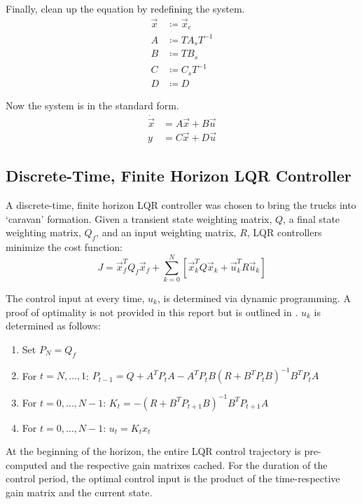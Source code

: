 \documentclass[12pt,onecolumn,reqno]{amsart}
\begin{document}
Finally, clean up the equation by redefining the system.
\begin{align*}
  \vec{x} &\coloneqq \vec{x}_{e}    \\
  A       &\coloneqq T A_{s} T^{-1} \\
  B       &\coloneqq T B_{s}        \\
  C       &\coloneqq C_{s} T^{-1}   \\
  D       &\coloneqq D
\end{align*}

Now the system is in the standard form.
\begin{align*}
  \dot{\vec{x}} &= A \vec{x} + B \vec{u} \\
  y &= C \vec{x} + D \vec{u}
\end{align*}




\subsection{Discrete-Time, Finite Horizon LQR Controller} \label{sec:LQR}
A discrete-time, finite horizon LQR controller was chosen to bring the trucks
into `caravan' formation. Given a transient state weighting matrix, $Q$, a final
state weighting matrix, $Q_{f}$, and an input weighting matrix, $R$, LQR
controllers minimize the cost function:
\begin{equation*}
  J = \vec{x}_{f}^{T} Q_{f} \vec{x}_{f} + \sum_{k=0}^{N} \left[ \vec{x}_{k}^{T} Q
  \vec{x}_{k} + \vec{u}_{k}^{T} R \vec{u}_{k} \right]
\end{equation*}

The control input at every time, $u_k$, is determined via dynamic programming. A
proof of optimality is not provided in this report but is outlined in
\cite{LQRStanford}. $u_k$ is determined as follows: 
\begin{enumerate}
  \item Set $P_{N} = Q_{f}$
  \item For $t=N, \hdots, 1$: $P_{t-1} = Q + A^{T}P_{t}A - A^{T} P_{t}
    B(R + B^{T}P_{t}B)^{-1}B^{T}P_{t}A$
  \item For $t=0, \hdots, N-1$: $K_{t} = -(R + B^{T} P_{t+1}
    B)^{-1}B^{T}P_{t+1}A$
  \item For $t=0, \hdots, N-1$: $u_{t}=K_{t}x_{t}$
\end{enumerate}

At the beginning of the horizon, the entire LQR control trajectory is
pre-computed and the respective gain matrixes cached. For the duration of the
control period, the optimal control input is the product of the time-respective
gain matrix and the current state.
\end{document}
